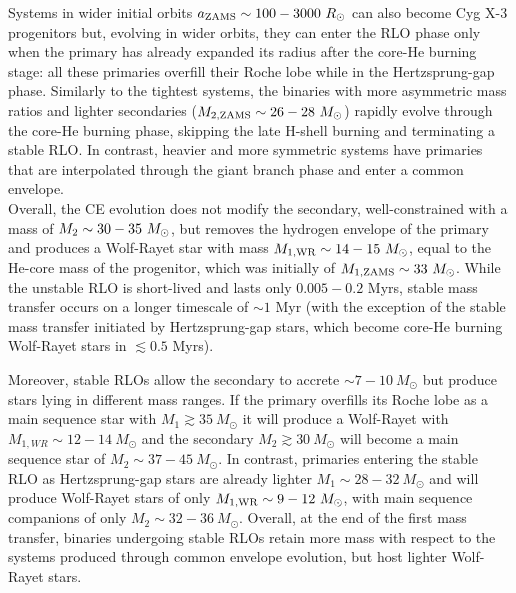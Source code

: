 \documentclass[a4paper,titlepage]{book}     	%
\newcommand{\sun}{\ensuremath{_\odot}}
\newcommand{\msun}{\ensuremath{M\sun}}
\newcommand{\rsun}{R_{\odot}}
\begin{document}
Systems in wider initial orbits $a_{\rm ZAMS} \sim 100 - 3000~\rsun$ can also become Cyg X-3 progenitors but, evolving in wider orbits, they can enter the RLO phase only when the primary has already expanded its radius after the core-He burning stage: all these primaries overfill their Roche lobe while in the Hertzsprung-gap phase. Similarly to the tightest systems, the binaries with more asymmetric mass ratios and lighter secondaries ($M_{\rm 2, ZAMS} \sim 26-28~\msun$) rapidly evolve through the core-He burning phase, skipping the late H-shell burning and terminating a stable RLO. In contrast, heavier and more symmetric systems have primaries that are interpolated through the giant branch phase and enter a common envelope.\\

Overall, the CE evolution does not modify the secondary, well-constrained with a mass of $M_{\rm 2} \sim 30-35~\msun$, but removes the hydrogen envelope of the primary and produces a Wolf-Rayet star with mass $M_{\rm 1, WR} \sim 14-15~\msun$, equal to the He-core mass of the progenitor, which was initially of $M_{\rm 1, ZAMS} \sim 33~\msun$. While the unstable RLO is short-lived and lasts only $0.005-0.2$ Myrs, stable mass transfer occurs on a longer timescale of $\sim 1$ Myr (with the exception of the stable mass transfer initiated by Hertzsprung-gap stars, which become core-He burning Wolf-Rayet stars in $\lesssim 0.5$ Myrs). 

Moreover, stable RLOs allow the secondary to accrete $\sim 7-10~\msun$ but produce stars lying in different mass ranges. If the primary overfills its Roche lobe as a main sequence star with $M_1 \gtrsim 35~\msun$ it will produce a Wolf-Rayet with $M_{1, WR} \sim 12-14~\msun$ and the secondary $M_2 \gtrsim 30~\msun$ will become a main sequence star of $M_{2} \sim 37-45~\msun$. In contrast, primaries entering the stable RLO as Hertzsprung-gap stars are already lighter $M_1 \sim 28-32~\msun$ and will produce Wolf-Rayet stars of only $M_{\rm 1, WR} \sim 9-12~\msun$, with main sequence companions of only $M_2 \sim 32-36~\msun$. Overall, at the end of the first mass transfer, binaries undergoing stable RLOs retain more mass with respect to the systems produced through common envelope evolution, but host lighter Wolf-Rayet stars. 
\end{document}
